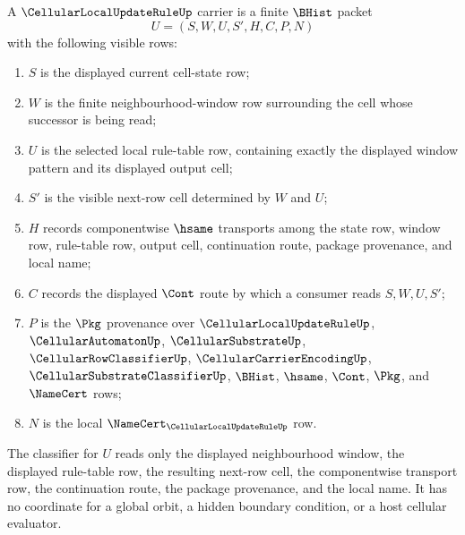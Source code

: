 \begin{definition}
\label{def:cellular-local-update-rule-carrier}
A $\CellularLocalUpdateRuleUp$ carrier is a finite $\BHist$ packet
$$
U=(S,W,U,S',H,C,P,N)
$$
with the following visible rows:
\begin{enumerate}
\item $S$ is the displayed current cell-state row;
\item $W$ is the finite neighbourhood-window row surrounding the cell whose successor is being read;
\item $U$ is the selected local rule-table row, containing exactly the displayed window pattern and its displayed output cell;
\item $S'$ is the visible next-row cell determined by $W$ and $U$;
\item $H$ records componentwise $\hsame$ transports among the state row, window row, rule-table row, output cell, continuation route, package provenance, and local name;
\item $C$ records the displayed $\Cont$ route by which a consumer reads $S,W,U,S'$;
\item $P$ is the $\Pkg$ provenance over $\CellularLocalUpdateRuleUp$, $\CellularAutomatonUp$, $\CellularSubstrateUp$, $\CellularRowClassifierUp$, $\CellularCarrierEncodingUp$, $\CellularSubstrateClassifierUp$, $\BHist$, $\hsame$, $\Cont$, $\Pkg$, and $\NameCert$ rows;
\item $N$ is the local $\NameCert_{\CellularLocalUpdateRuleUp}$ row.
\end{enumerate}
The classifier for $U$ reads only the displayed neighbourhood window, the displayed rule-table row, the resulting next-row cell, the componentwise transport row, the continuation route, the package provenance, and the local name. It has no coordinate for a global orbit, a hidden boundary condition, or a host cellular evaluator.
\end{definition}

